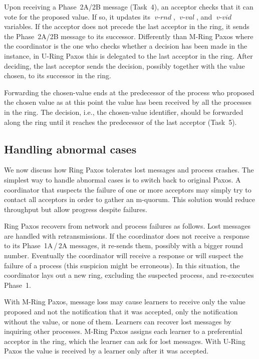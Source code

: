 \documentclass[final,3p,times,twocolumn,authoryear]{elsarticle}
\newcommand{\mv}[1]{\ensuremath{\operatorname{\mathit{#1}}}}
\begin{document}
Upon receiving a Phase~2A/2B message (Task~4), an acceptor checks that it can vote for the proposed value. If so, it updates its \mv{v-rnd}, \mv{v-val}, and \mv{v-vid} variables. If the acceptor does not precede the last acceptor in the ring, it sends the Phase~2A/2B message to its successor.
Differently than M-Ring Paxos where the coordinator is the one who checks whether a decision has been made in the instance, in U-Ring Paxos this is delegated to the last acceptor in the ring. After deciding, the last acceptor sends the decision, possibly together with the value chosen, to its successor in the ring.

Forwarding the chosen-value ends at the predecessor of the process who proposed the chosen value as at this point the value has been received by all the processes in the ring.
The decision, i.e., the chosen-value identifier, should be forwarded along the ring until it reaches the predecessor of the last acceptor (Task~5). 

\subsection{Handling abnormal cases}
\label{sec:handlingfail}

We now discuss how Ring Paxos tolerates lost messages and process crashes. The simplest way to handle abnormal cases is to switch back to original Paxos. A coordinator that suspects the failure of one or more acceptors may simply try to contact all acceptors in order to gather an m-quorum. This solution would reduce throughput but allow progress despite failures. 

Ring Paxos recovers from network and process failures as follows. Lost messages are handled with retransmissions. If the coordinator does not receive a response to its Phase~1A\,/\,2A messages, it re-sends them, possibly with a bigger round number. Eventually the coordinator will receive a response or will suspect the failure of a process (this suspicion might be erroneous). In this situation, the coordinator  lays out a new ring, excluding the suspected process, and re-executes Phase~1. 

With M-Ring Paxos, message loss may cause learners to receive only the value proposed and not the notification that it was accepted, only the notification without the value, or none of them. Learners can recover lost messages by inquiring other processes. M-Ring Paxos assigns each learner to a preferential acceptor in the ring, which the learner can ask for lost messages. With U-Ring Paxos the value is received by a learner only after it was accepted. 
\end{document}
